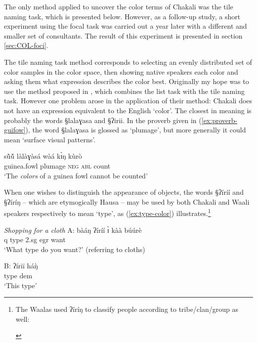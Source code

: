 The only method applied to uncover the color terms of Chakali was the tile
naming task, which is presented below. However, as a follow-up study,   a short
experiment using the focal task was carried out a year
later with a
different and smaller set of  consultants. The result of this experiment is
presented in section
\ref{sec:COL-foci}.

The tile
naming task method corresponds to selecting an  evenly
distributed set of color samples in the color space, then showing native
speakers each color and asking them what expression describes the color best.
Originally my hope was to use the method proposed in \cite{Davi95}, which
combines the list task with the tile naming task.  However one problem arose in
the application of their method: Chakali does not have an
expression equivalent to the English `color'. The closest in meaning is
probably the words {\S lalaɣasa} and {\S ʔirii}. In the proverb given in
(\ref{ex:proverb-guifow}),  the word {\S lalaɣasa} is glossed as
 `plumage',  but more generally it could mean `surface visual patterns'.

\begin{exe}
 \ex\label{ex:proverb-guifow}
\gll sũ̀ṹ làlàɣàsá wàá kɪ̀ŋ kùrò\\
guinea.fowl plumage \textsc{neg}  \textsc{abl} count \\
\glt `The {\it colors} of a guinea fowl cannot be counted'
\end{exe}


When one wishes to distinguish the appearance of objects, the words
{\S ʔíríí} and {\S ʔíríŋ} -- which are etymogically Hausa --  may be used by both Chakali and Waali speakers
respectively  to mean `type',  as
(\ref{ex:type-color}) illustrates.\footnote{The Waalas used {\F ʔíríŋ} to
classify people according to tribe/clan/group as well:
\begin{exe}
\end{exe}
}


\begin{exe}
\ex\label{ex:type-color}{\it Shopping for a cloth}
\gll A: bàáŋ ʔíríí ɪ̀ kàà búúrè\\
{}  {\sc q} type {\sc 2.sg} {\sc egr} want\\
\glt {} `What type do you want?' (referring to cloths)

\gll B:  ʔírīī háŋ̀ \\
{} type {\sc dem} \\
\glt  `This type'
\end{exe}

